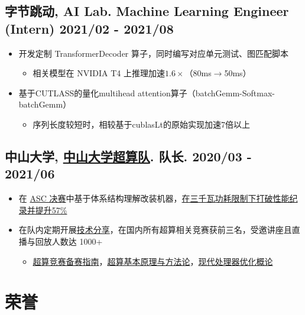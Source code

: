 \documentclass[
    scheme=plain
]{ctexart}
\newcommand{\datedsubsection}[2]{%
\subsection[#1]{#1 \hfill #2}
}
\begin{document}
\datedsubsection{\textbf{字节跳动}, AI Lab. Machine Learning Engineer (Intern)}{2021/02 - 2021/08}

\begin{itemize}
  \item 开发定制 TransformerDecoder 算子，同时编写对应单元测试、图匹配脚本
        \begin{itemize}
          \item 相关模型在 NVIDIA T4 上推理加速$1.6\times$（80ms$\to$50ms）
        \end{itemize}
  \item 基于CUTLASS的量化multihead attention算子（batchGemm-Softmax-batchGemm）
        \begin{itemize}
          \item 序列长度较短时，相较基于cublasLt的原始实现加速7倍以上
        \end{itemize}
\end{itemize}

\datedsubsection{\textbf{中山大学}, \href{https://scc.sysu.tech}{中山大学超算队}. 队长.}{2020/03 - 2021/06}

\begin{itemize}
  \item 在 \href{https://wu-kan.cn/2021/05/19/\%E6\%88\%91\%E7\%9A\%84ASC\%E5\%86\%B3\%E8\%B5\%9B\%E5\%A4\%8D\%E7\%9B\%98-\%E5\%86\%92\%E9\%99\%A9-\%E5\%A4\%B1\%E8\%AF\%AF\%E4\%B8\%8E\%E7\%BF\%BB\%E8\%BD\%A6/}{ASC 决赛}中基于体系结构理解改装机器，\href{https://mp.weixin.qq.com/s?__biz=MzI5NzUxMDAxOQ==&mid=2247486028&idx=1&sn=08b70942a6e7b0f8e4cd42a98789f4fe}{在三千瓦功耗限制下打破性能纪录并提升57\%}
  \item 在队内定期开展\href{https://scc.sysu.tech/Talks/}{技术分享}，在国内所有超算相关竞赛获前三名，受邀讲座且直播与回放人数达 1000+
        \begin{itemize}
          \item \href{https://sysu-scc.feishu.cn/file/boxcnyn3xp9JJz7rNyjUtUAhHLc}{超算竞赛备赛指南}，\href{https://sysu-scc.feishu.cn/file/boxcnjtWoYlkvSF4pF4grCwudFr}{超算基本原理与方法论}，\href{https://sysu-scc.feishu.cn/file/boxcnQcRimOByBFREJEc5lgtgXc}{现代处理器优化概论}
        \end{itemize}
\end{itemize}

\section{荣誉}
\end{document}
